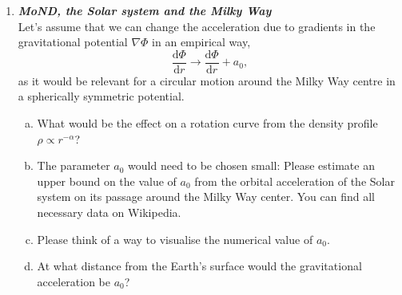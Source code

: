 \documentclass[a4paper,12pt]{article}
\newcommand{\question}[1]{\textbf{\textit{#1}}}
\newcommand{\dd}{\mathrm{d}}
\begin{document}
\begin{enumerate}
\item \question{MoND, the Solar system and the Milky Way}\\
Let's assume that we can change the acceleration due to gradients in the gravitational potential $\nabla\Phi$ in an empirical way,
\begin{equation}
\frac{\dd\Phi}{\dd r} \rightarrow \frac{\dd\Phi}{\dd r} + a_0,
\end{equation}
as it would be relevant for a circular motion around the Milky Way centre in a spherically symmetric potential.
\begin{enumerate}[(a)]
\item{What would be the effect on a rotation curve from the density profile $\rho\propto r^{-\alpha}$?}
\item{The parameter $a_0$ would need to be chosen small: Please estimate an upper bound on the value of $a_0$ from the orbital acceleration of the Solar system on its passage around the Milky Way center. You can find all necessary data on Wikipedia.}
\item{Please think of a way to visualise the numerical value of $a_0$.}
\item{At what distance from the Earth's surface would the gravitational acceleration be $a_0$?}
\end{enumerate}


\end{enumerate}
\end{document}

